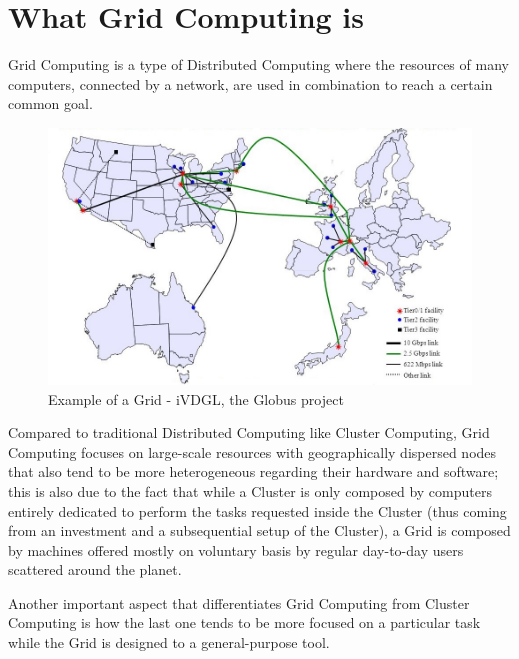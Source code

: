 \section{What Grid Computing is}
Grid Computing is a type of Distributed Computing where the resources of many computers, connected by a network, are used in combination to reach a certain common goal.

\begin{figure}[!ht]
    \centering
    \includegraphics[scale=0.46]{document/chapters/chapter_1/images/iVDGL_globus.jpg}
    \caption{Example of a Grid - iVDGL, the Globus project \cite{iVDGL}}
    \label{fig:iVDGL}
\end{figure}

Compared to traditional Distributed Computing like Cluster Computing, Grid Computing focuses on large-scale resources with geographically dispersed nodes that also tend to be more heterogeneous regarding their hardware and software; this is also due to the fact that while a Cluster is only composed by computers entirely dedicated to perform the tasks requested inside the Cluster (thus coming from an investment and a subsequential setup of the Cluster), a Grid is composed by machines offered mostly on voluntary basis by regular day-to-day users scattered around the planet.

Another important aspect that differentiates Grid Computing from Cluster Computing is how the last one tends to be more focused on a particular task while the Grid is designed to a general-purpose tool.

